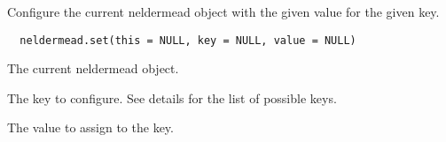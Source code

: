 %
\begin{Description}\relax
Configure the current neldermead object with the given value for the given
key.
\end{Description}
%
\begin{Usage}
\begin{verbatim}
  neldermead.set(this = NULL, key = NULL, value = NULL)
\end{verbatim}
\end{Usage}
%
\begin{Arguments}
\begin{ldescription}
\item[\code{this}] The current neldermead object.
\item[\code{key}] The key to configure. See details for the list of possible keys.
\item[\code{value}] The value to assign to the key.
\end{ldescription}
\end{Arguments}
%
